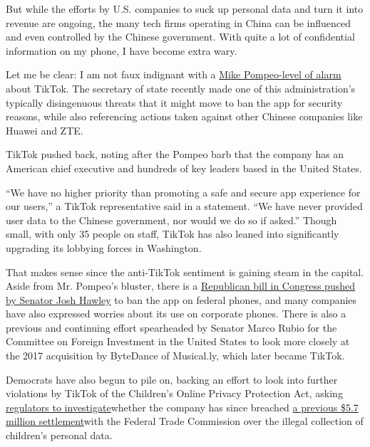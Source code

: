 But while the efforts by U.S. companies to suck up personal data and
turn it into revenue are ongoing, the many tech firms operating in China
can be influenced and even controlled by the Chinese government. With
quite a lot of confidential information on my phone, I have become extra
wary.

Let me be clear: I am not faux indignant with a
\href{https://www.nytimes3xbfgragh.onion/reuters/2020/07/07/business/07reuters-usa-tiktok-china-pompeo.html}{Mike
Pompeo-level of alarm} about TikTok. The secretary of state recently
made one of this administration's typically disingenuous threats that it
might move to ban the app for security reasons, while also referencing
actions taken against other Chinese companies like Huawei and ZTE.

TikTok pushed back, noting after the Pompeo barb that the company has an
American chief executive and hundreds of key leaders based in the United
States.

``We have no higher priority than promoting a safe and secure app
experience for our users,'' a TikTok representative said in a statement.
``We have never provided user data to the Chinese government, nor would
we do so if asked.'' Though small, with only 35 people on staff, TikTok
has also leaned into significantly upgrading its lobbying forces in
Washington.

That makes sense since the anti-TikTok sentiment is gaining steam in the
capital. Aside from Mr. Pompeo's bluster, there is a
\href{https://www.nytimes3xbfgragh.onion/reuters/2020/07/15/technology/15reuters-usa-legislation-tiktok.html}{Republican
bill in Congress pushed by Senator Josh Hawley} to ban the app on
federal phones, and many companies have also expressed worries about its
use on corporate phones. There is also a previous and continuing effort
spearheaded by Senator Marco Rubio for the Committee on Foreign
Investment in the United States to look more closely at the 2017
acquisition by ByteDance of Musical.ly, which later became TikTok.

Democrats have also begun to pile on, backing an effort to look into
further violations by TikTok of the Children's Online Privacy Protection
Act, asking
\href{https://www.nytimes3xbfgragh.onion/reuters/2020/07/07/business/07reuters-tiktok-privacy-children-exclusive.html}{regulators
to investigate}whether the company has since breached
\href{https://www.ftc.gov/news-events/press-releases/2019/02/video-social-networking-app-musically-agrees-settle-ftc}{a
previous \$5.7 million settlement}with the Federal Trade Commission over
the illegal collection of children's personal data.

